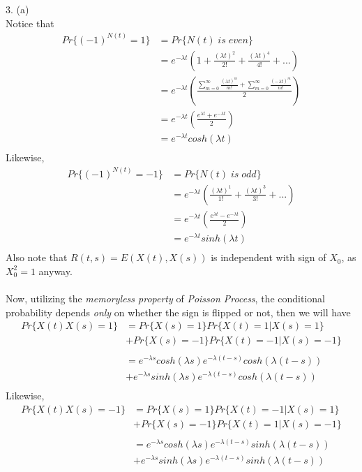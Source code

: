 \documentclass [12pt] {article}
\begin{document}
3. (a)\\
Notice that \begin{align*}
Pr\{ (-1)^{N(t)} = 1\} &= Pr\{N(t)\; is \; even\}\\
&=e^{-\lambda t} (1 + \frac{(\lambda t)^2}{2!} + \frac{(\lambda t)^4}{4!}+ ...)\\
&= e^{-\lambda t} (\frac{\sum\limits_{m=0}^\infty \frac{(\lambda t)^m}{m!} + \sum\limits_{m=0}^\infty \frac{(-\lambda t)^m}{m!}}{2})\\
&= e^{-\lambda t} (\frac{e^{\lambda t} + e^{-\lambda t}}{2})\\
&= e^{-\lambda t} cosh(\lambda t)\\
\end{align*}
Likewise, \begin{align*}
Pr\{ (-1)^{N(t)} = -1\} &= Pr\{N(t)\; is \; odd\}\\
&=e^{-\lambda t} (\frac{(\lambda t)^1}{1!} + \frac{(\lambda t)^3}{3!}+ ...)\\
&= e^{-\lambda t} (\frac{e^{\lambda t} - e^{-\lambda t}}{2})\\
&= e^{-\lambda t} sinh(\lambda t)\\
\end{align*}
Also note that $R(t, s) = E(X(t), X(s))$ is independent with sign of $X_0$, as $X_0^2 = 1$ anyway.\\
~\\
Now, utilizing the \emph{memoryless property} of \emph{Poisson Process}, the conditional probability depends \emph{only} on whether the sign is flipped or not, then we will have \\
\begin{align*}
Pr\{X(t) X(s) = 1\} & = Pr\{X(s) = 1\} Pr\{X(t) = 1 | X(s) = 1\}\\
&+   Pr\{X(s) = -1\} Pr\{X(t) = -1 | X(s) = -1\}\\
\\
&=e^{-\lambda s} cosh(\lambda s) e^{-\lambda (t-s)} cosh(\lambda (t-s))\\
&+e^{-\lambda s} sinh(\lambda s) e^{-\lambda (t-s)} cosh(\lambda (t-s))\\
\end{align*}
Likewise, \begin{align*}
Pr\{X(t) X(s) = -1\} & = Pr\{X(s) = 1\} Pr\{X(t) = -1 | X(s) = 1\}\\
&+   Pr\{X(s) = -1\} Pr\{X(t) = 1 | X(s) = -1\}\\
\\
&=e^{-\lambda s} cosh(\lambda s) e^{-\lambda (t-s)} sinh(\lambda (t-s))\\
&+e^{-\lambda s} sinh(\lambda s) e^{-\lambda (t-s)} sinh(\lambda (t-s))\\
\end{align*}
\end{document}
